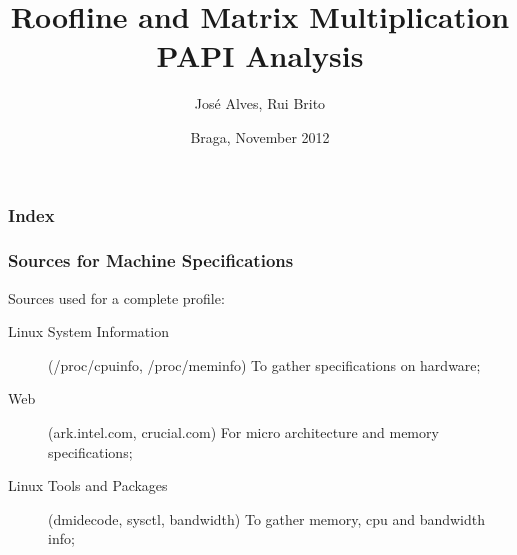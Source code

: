 \documentclass{beamer}
\title{Roofline and Matrix Multiplication PAPI Analysis}
\author{José Alves, Rui Brito}
\institute[pg22765, pg22781]{
	Universidade do Minho
}
\date{Braga, November 2012}
\begin{document}

\maketitle%

\begin{frame}
	\frametitle{Index}
	\tableofcontents
\end{frame}

\begin{frame}
	\frametitle{Sources for Machine Specifications}

	Sources used for a complete profile:
	\begin{description}
		\item[Linux System Information] (/proc/cpuinfo, /proc/meminfo) To gather specifications on hardware;\\
		\item[Web] (ark.intel.com, crucial.com) For micro architecture and memory specifications;\\
		\item[Linux Tools and Packages] (dmidecode, sysctl, bandwidth) To gather memory, cpu and bandwidth info;\\
	\end{description}

\end{frame}
\end{document}
